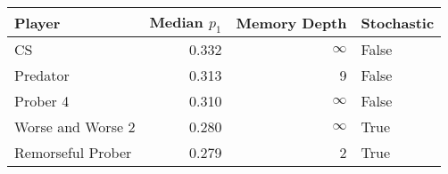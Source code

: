 \begin{tabular}{lrrl}
\toprule
            Player &  Median $p_1$ &  Memory Depth & Stochastic \\
\midrule
                CS &         0.332 &            \(\infty\) &      False \\
          Predator &         0.313 &             9 &      False \\
          Prober 4 &         0.310 &            \(\infty\) &      False \\
 Worse and Worse 2 &         0.280 &            \(\infty\) &       True \\
 Remorseful Prober &         0.279 &             2 &       True \\
\bottomrule
\end{tabular}
